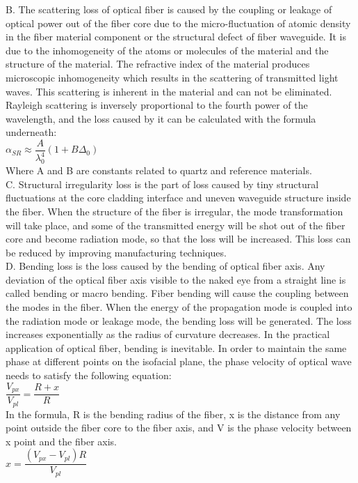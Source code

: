 \documentclass[a4paper]{article}
\begin{document}
B. The scattering loss of optical fiber is caused by the coupling or leakage of optical power out of the fiber core due to the micro-fluctuation of atomic density in the fiber material component or the structural defect of fiber waveguide. It is due to the inhomogeneity of the atoms or molecules of the material and the structure of the material. The refractive index of the material produces microscopic inhomogeneity which results in the scattering of transmitted light waves. This scattering is inherent in the material and can not be eliminated. Rayleigh scattering is inversely proportional to the fourth power of the wavelength, and the loss caused by it can be calculated with the formula underneath:\\
$\alpha _{SR}\approx \dfrac{A}{\lambda _{0}^{4}}\left ( 1+B\Delta _{0} \right )$\cite{cJ. Geisler}\\
Where A and B are constants related to quartz and reference materials.
\\

C. Structural irregularity loss is the part of loss caused by tiny structural fluctuations at the core cladding interface and uneven waveguide structure inside the fiber. When the structure of the fiber is irregular, the mode transformation will take place, and some of the transmitted energy will be shot out of the fiber core and become radiation mode, so that the loss will be increased. This loss can be reduced by improving manufacturing techniques.
\\

D. Bending loss is the loss caused by the bending of optical fiber axis. Any deviation of the optical fiber axis visible to the naked eye from a straight line is called bending or macro bending. Fiber bending will cause the coupling between the modes in the fiber. When the energy of the propagation mode is coupled into the radiation mode or leakage mode, the bending loss will be generated. The loss increases exponentially as the radius of curvature decreases.
In the practical application of optical fiber, bending is inevitable. In order to maintain the same phase at different points on the isofacial plane, the phase velocity of optical wave needs to satisfy the following equation:\\
$\dfrac{V_{px}}{V_{pl}}=\dfrac{R+x}{R}$\cite{cJ. Geisler}\\
In the formula, R is the bending radius of the fiber, x is the distance from any point outside the fiber core to the fiber axis, and V is the phase velocity between x point and the fiber axis.\\
$x=\dfrac{(V_{px}-V_{pl})R}{V_{pl}}$\cite{cJ. Geisler}
\\
\end{document}
